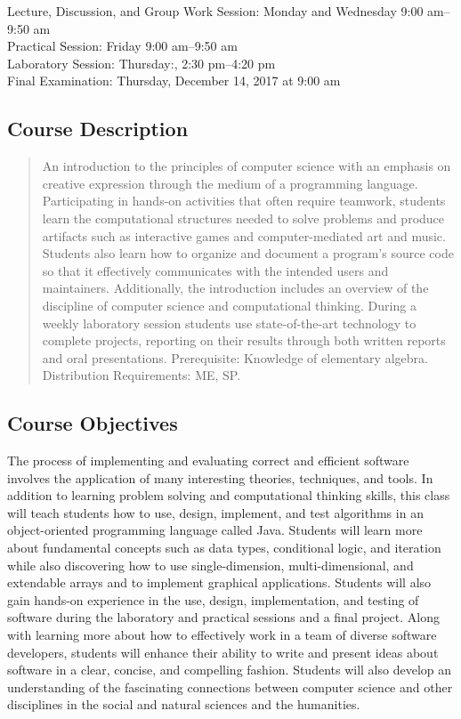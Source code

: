 \documentclass[11pt]{article}
\begin{document}
Lecture, Discussion, and Group Work Session: Monday and Wednesday 9:00 am--9:50 am \\
Practical Session: Friday 9:00 am--9:50 am \\
Laboratory Session: Thursday:, 2:30 pm--4:20 pm \\
Final Examination: Thursday, December 14, 2017 at 9:00 am

\subsection*{Course Description}

\begin{quote}

An introduction to the principles of computer science with an emphasis on creative expression through the medium of a
programming language. Participating in hands-on activities that often require teamwork, students learn the computational
structures needed to solve problems and produce artifacts such as interactive games and computer-mediated art and music.
Students also learn how to organize and document a program's source code so that it effectively communicates with the
intended users and maintainers. Additionally, the introduction includes an overview of the discipline of computer
science and computational thinking. During a weekly laboratory session students use state-of-the-art technology to
complete projects, reporting on their results through both written reports and oral presentations. Prerequisite:
Knowledge of elementary algebra. Distribution Requirements: ME, SP.\@ \\

\end{quote}

\subsection*{Course Objectives}

The process of implementing and evaluating correct and efficient software involves the application of many interesting
theories, techniques, and tools. In addition to learning problem solving and computational thinking skills, this class
will teach students how to use, design, implement, and test algorithms in an object-oriented programming language called
Java. Students will learn more about fundamental concepts such as data types, conditional logic, and iteration while
also discovering how to use single-dimension, multi-dimensional, and extendable arrays and to implement graphical
applications. Students will also gain hands-on experience in the use, design, implementation, and testing of software
during the laboratory and practical sessions and a final project. Along with learning more about how to effectively work
in a team of diverse software developers, students will enhance their ability to write and present ideas about software
in a clear, concise, and compelling fashion. Students will also develop an understanding of the fascinating connections
between computer science and other disciplines in the social and natural sciences and the humanities.
\end{document}

